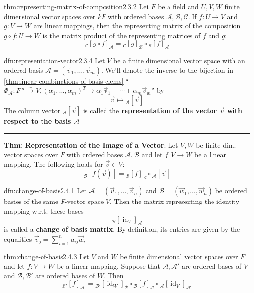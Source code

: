 \documentclass[landscape, 8pt]{extarticle}
\DeclareMathOperator{\id}{id}
\begin{document}
\begin{multicols}{3}
\begin{thm}{thm:representing-matrix-of-composition}{2.3.2}
    Let $F$ be a field and $U,V,W$ finite dimensional vector spaces over $kF$ with ordered bases $\mathcal{A}, \mathcal{B}, \mathcal{C}$. If $f : U \to V$ and $g : V \to W$ are linear mappings, then the representing matrix of the composition $g \circ f : U \to W$ is the matrix product of the representing matrices of $f$ and $g$:
    \[{}_{\mathcal{C}}[g \circ f]_{\mathcal{A}} = {}_{\mathcal{C}}[g]_{\mathcal{B}} \circ {}_{\mathcal{B}}[f]_{\mathcal{A}}\]
\end{thm}

\begin{dfn}{dfn:representation-vector}{2.3.4}
    Let $V$ be a finite dimensional vector space with an ordered basis $\mathcal{A} = (\vec{v}_{1},\dots,\vec{v}_{m})$. We'll denote the inverse to the bijection in \ref{thm:linear-combinations-of-basis-elems} ``$\Phi_{\mathcal{A}} : F^{m} \xrightarrow{\sim} V, (\alpha_{1},\dots,\alpha_{m})^{T} \mapsto \alpha_{1}\vec{v}_{1} +\cdots + \alpha_{m}\vec{v}_{m}$'' by
    \[\vec{v} \mapsto {}_{\mathcal{A}}[\vec{v}]\]
    The column vector ${}_{\mathcal{A}}[\vec{v}]$ is called the \textbf{representation of the vector $\vec{v}$ with respect to the basis $\mathcal{A}$}

    \noindent\rule{\textwidth}{0.2pt}
    \textbf{Thm: Representation of the Image of a Vector}: Let $V,W$ be finite dim. vector spaces over $F$ with ordered bases $\mathcal{A}, \mathcal{B}$ and let $f : V \to W$ be a linear mapping. The following holds for $\vec{v}\in V$:
    \[{}_{\mathcal{B}}[f(\vec{v})] = {}_{\mathcal{B}}[f]_{\mathcal{A}}\circ {}_{\mathcal{A}}[\vec{v}]\]
\end{dfn}


\begin{dfn}{dfn:change-of-basis}{2.4.1}
    Let $\mathcal{A} = (\vec{v}_{1},\dots,\vec{v}_{n})$ and $\mathcal{B} = (\vec{w}_{1},\dots,\vec{w}_{n})$ be ordered basies of the same $F$-vector space $V$. Then the matrix representing the identity mapping w.r.t. these bases
    \[{}_{\mathcal{B}}[\id_{V}]_{\mathcal{A}}\]
    is called a \textbf{change of basis matrix}. By definition, its entries are given by the equalities $\vec{v}_{j} = \sum_{i = 1}^{n} a_{ij}\vec{w}_{i}$
\end{dfn}

\begin{thm}{thm:change-of-basis}{2.4.3}
    Let $V$ and $W$ be finite dimensional vector spaces over $F$ and let $f : V \to W$ be a linear mapping. Suppose that $\mathcal{A}, \mathcal{A}'$ are ordered bases of $V$ and $\mathcal{B}, \mathcal{B}'$ are ordered bases of $W$. Then
    \[{}_{\mathcal{B}'}[f]_{\mathcal{A}'} = {}_{\mathcal{B}'}[\id_{W}]_{\mathcal{B}} \circ {}_{\mathcal{B}}[f]_{\mathcal{A}} \circ {}_{\mathcal{A}}[\id_{V}]_{\mathcal{A}'}\]


\end{thm}
\end{multicols}
\end{document}
